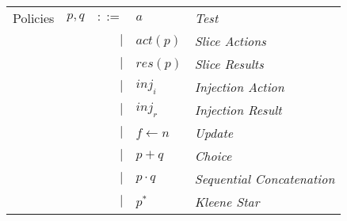 \documentclass[12pt, letterpaper]{article}
\begin{document}
    \begin{tabular}{l c r l l}
        Policies    & $p,q$ & $::=$  & $a$              & \textit{Test}     \\
                    &       & $\mid$ & $act(p)$         & \textit{Slice Actions}    \\
                    &       & $\mid$ & $res(p)$         & \textit{Slice Results}    \\
                    &       & $\mid$ & $inj_{i}$        & \textit{Injection Action} \\
                    &       & $\mid$ & $inj_{r}$        & \textit{Injection Result} \\
                    &       & $\mid$ & $f \leftarrow n$ & \textit{Update}   \\
                    &       & $\mid$ & $p + q$          & \textit{Choice}   \\
                    &       & $\mid$ & $p \cdot q$      & \textit{Sequential Concatenation} \\
                    &       & $\mid$ & $p ^{*}$         & \textit{Kleene Star}
    \end{tabular}\\


\end{document}
